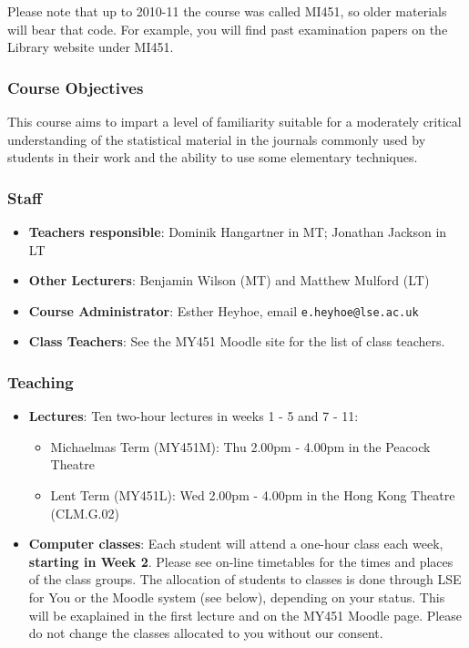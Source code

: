 \documentclass[11pt,a4paper,openany]{book}
\begin{document}
Please note that up to 2010-11 the course was called MI451, so older
materials will bear that code. For example, you will find past
examination papers on the Library website under MI451.

\subsubsection*{Course Objectives}\label{course-objectives}

This course aims to impart a level of familiarity suitable for a
moderately critical understanding of the statistical material in the
journals commonly used by students in their work and the ability to use
some elementary techniques.

\subsubsection*{Staff}\label{staff}

\begin{itemize}
\item
  \textbf{Teachers responsible}: Dominik Hangartner in MT; Jonathan
  Jackson in LT
\item
  \textbf{Other Lecturers}: Benjamin Wilson (MT) and Matthew Mulford
  (LT)
\item
  \textbf{Course Administrator}: Esther Heyhoe, email
  \texttt{e.heyhoe@lse.ac.uk}
\item
  \textbf{Class Teachers}: See the MY451 Moodle site for the list of
  class teachers.
\end{itemize}

\newpage

\subsubsection*{Teaching}\label{teaching}

\begin{itemize}
\item
  \textbf{Lectures}: Ten two-hour lectures in weeks 1 - 5 and 7 - 11:

  \begin{itemize}
  \item
    Michaelmas Term (MY451M): Thu 2.00pm - 4.00pm in the Peacock Theatre
  \item
    Lent Term (MY451L): Wed 2.00pm - 4.00pm in the Hong Kong Theatre
    (CLM.G.02)
  \end{itemize}
\item
  \textbf{Computer classes}: Each student will attend a one-hour class
  each week, \textbf{starting in Week 2}. Please see on-line timetables
  for the times and places of the class groups. The allocation of
  students to classes is done through LSE for You or the Moodle system
  (see below), depending on your status. This will be exaplained in the
  first lecture and on the MY451 Moodle page. Please do not change the
  classes allocated to you without our consent.
\end{itemize}
\end{document}

